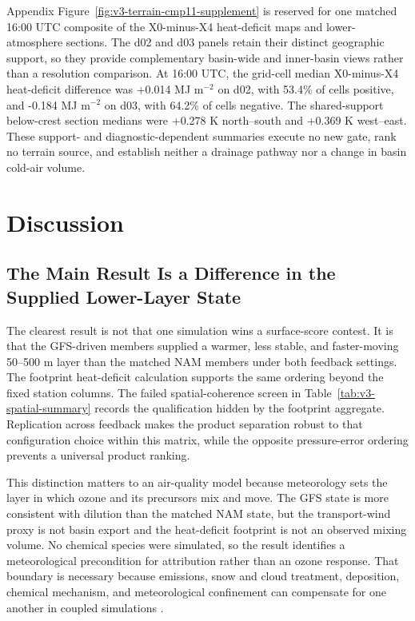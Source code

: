 \documentclass[air,article,submit,moreauthors]{Definitions/mdpi}
\begin{document}
Appendix Figure~\ref{fig:v3-terrain-cmp11-supplement} is reserved for one matched 16:00 UTC composite of the X0-minus-X4 heat-deficit maps and lower-atmosphere sections.
The d02 and d03 panels retain their distinct geographic support, so they provide complementary basin-wide and inner-basin views rather than a resolution comparison.
At 16:00 UTC, the grid-cell median X0-minus-X4 heat-deficit difference was +0.014 MJ m$^{-2}$ on d02, with 53.4\% of cells positive, and -0.184 MJ m$^{-2}$ on d03, with 64.2\% of cells negative.
The shared-support below-crest section medians were +0.278 K north--south and +0.369 K west--east.
These support- and diagnostic-dependent summaries execute no new gate, rank no terrain source, and establish neither a drainage pathway nor a change in basin cold-air volume.

\section{Discussion}

\subsection{The Main Result Is a Difference in the Supplied Lower-Layer State}

The clearest result is not that one simulation wins a surface-score contest.
It is that the GFS-driven members supplied a warmer, less stable, and faster-moving 50--500 m layer than the matched NAM members under both feedback settings.
The footprint heat-deficit calculation supports the same ordering beyond the fixed station columns.
The failed spatial-coherence screen in Table~\ref{tab:v3-spatial-summary} records the qualification hidden by the footprint aggregate.
Replication across feedback makes the product separation robust to that configuration choice within this matrix, while the opposite pressure-error ordering prevents a universal product ranking.

This distinction matters to an air-quality model because meteorology sets the layer in which ozone and its precursors mix and move.
The GFS state is more consistent with dilution than the matched NAM state, but the transport-wind proxy is not basin export and the heat-deficit footprint is not an observed mixing volume.
No chemical species were simulated, so the result identifies a meteorological precondition for attribution rather than an ozone response.
That boundary is necessary because emissions, snow and cloud treatment, deposition, chemical mechanism, and meteorological confinement can compensate for one another in coupled simulations \citep{Ahmadov2015-zm,Neemann2015-ws,Matichuk2017-bq}.
\end{document}
